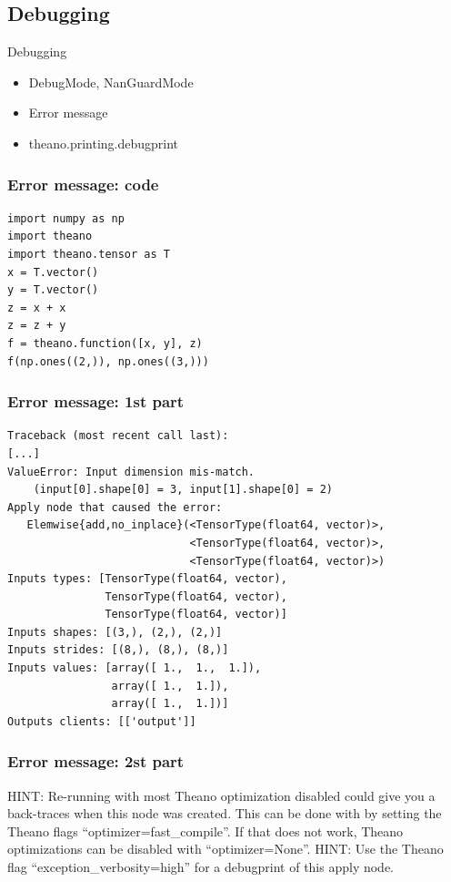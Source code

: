 \documentclass[utf8x,xcolor=pdftex,dvipsnames,table]{beamer}
\begin{document}
\subsection{Debugging}
\begin{frame}{Debugging}
  \begin{itemize}
  \item DebugMode, NanGuardMode
  \item Error message
  \item theano.printing.debugprint
  \end{itemize}
\end{frame}

\begin{frame}[fragile]
  \frametitle{Error message: code}
\begin{lstlisting}
import numpy as np
import theano
import theano.tensor as T
x = T.vector()
y = T.vector()
z = x + x
z = z + y
f = theano.function([x, y], z)
f(np.ones((2,)), np.ones((3,)))
\end{lstlisting}
\end{frame}

\begin{frame}[fragile]
  \frametitle{Error message: 1st part}

\begin{lstlisting}
Traceback (most recent call last):
[...]
ValueError: Input dimension mis-match.
    (input[0].shape[0] = 3, input[1].shape[0] = 2)
Apply node that caused the error:
   Elemwise{add,no_inplace}(<TensorType(float64, vector)>,
                            <TensorType(float64, vector)>,
                            <TensorType(float64, vector)>)
Inputs types: [TensorType(float64, vector),
               TensorType(float64, vector),
               TensorType(float64, vector)]
Inputs shapes: [(3,), (2,), (2,)]
Inputs strides: [(8,), (8,), (8,)]
Inputs values: [array([ 1.,  1.,  1.]),
                array([ 1.,  1.]),
                array([ 1.,  1.])]
Outputs clients: [['output']]
\end{lstlisting}
\end{frame}

\begin{frame}[fragile]
  \frametitle{Error message: 2st part}
HINT: Re-running with most Theano optimization
disabled could give you a back-traces when this
node was created. This can be done with by setting
the Theano flags ``optimizer=fast\_compile''. If that does not
work, Theano optimizations can be disabled with
``optimizer=None''.\newline
HINT: Use the Theano flag ``exception\_verbosity=high''
for a debugprint of this apply node.
\end{frame}
\end{document}
